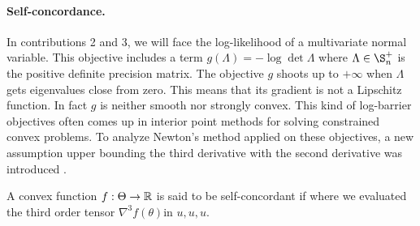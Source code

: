 \paragraph{Self-concordance.}
In contributions 2 and 3, we will face the log-likelihood of a multivariate normal variable. 
This objective includes a term $g(\Lambda) = -\log \det \Lambda$ where $\Lambda\in \S_n^+$ is the positive definite precision matrix. 
The objective $g$ shoots up to $+\infty$ when $\Lambda$ gets eigenvalues close from zero. 
This means that its gradient is not a Lipschitz function.
In fact  $g$ is neither smooth nor strongly convex.
This kind of log-barrier objectives often comes up in interior point methods for solving constrained convex problems.
To analyze Newton's method applied on these objectives, a new assumption upper bounding the third derivative with the second derivative was introduced \citep{nemirovski1983problem}. 
\begin{definition}
	\citep[definition 4.1.1]{nesterov2004Intro}
	A convex function $f:\Theta \rightarrow\mathbb{R}$ is said to be self-concordant if
	where we evaluated the third order tensor $\nabla^3 f(\theta)$in $u,u,u$.
\end{definition}


